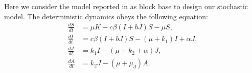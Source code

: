 Here we consider the model reported in \cite{Cai2009} as block base to
design our stochastic model. The deterministic dynamics obeys the following 
equation:
%
\begin{equation}
    \begin{aligned}
        \frac{dS}{dt} &=
            \mu K - c \beta (I + b J) S - \mu S,
            \\
        \frac{dI}{dt} &=
            c \beta (I + b J) S - (\mu + k_1)  I + \alpha J,
            \\
        \frac{dJ}{dt} &=
            k_1 I - (\mu + k_2 + \alpha) J,
            \\
        \frac{dA}{dt} &=
            k_2 J - (\mu + \mu_d) A.
    \end{aligned}
\end{equation}
